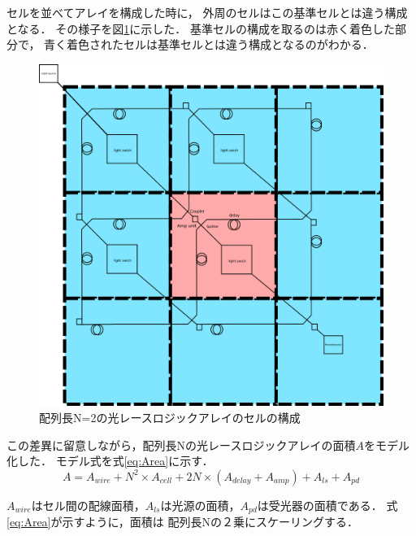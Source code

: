 セルを並べてアレイを構成した時に，
外周のセルはこの基準セルとは違う構成となる．
その様子を図\ref{fig:N=2_1}に示した．
基準セルの構成を取るのは赤く着色した部分で，
青く着色されたセルは基準セルとは違う構成となるのがわかる．
\begin{figure}[t!]
\begin{center}
\includegraphics[keepaspectratio,scale=0.3]{fig/4/lightracelogic_N_2_1.png}
\caption{配列長N=2の光レースロジックアレイのセルの構成}
\label{fig:N=2_1}
\end{center}
\end{figure}
この差異に留意しながら，配列長Nの光レースロジックアレイの面積$A$をモデル化した．
モデル式を式\ref{eq:Area}に示す．
\begin{equation}
A = A_{wire}+N^2 \times A_{cell} + 2N \times (A_{delay}+A_{amp}) +A_{ls}+A_{pd}
\label{eq:Area}
\end{equation}

$A_{wire}はセル間の配線面積，A_{ls}は光源の面積，A_{pd}は受光器の面積である．$
式\ref{eq:Area}が示すように，面積は
配列長Nの２乗にスケーリングする．

